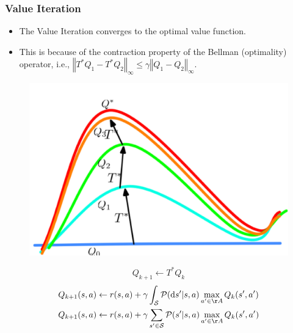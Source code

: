 \documentclass{beamer}
\newcommand{\Topt}{{T^*}}
\newcommand{\States}{\mathcal{S}}
\newcommand{\PKernel}{\mathcal{P}}
\newcommand{\ds}{\mathrm{d}s}
\newcommand{\norm}[1]{\left\Vert#1\right\Vert}
\begin{document}
\begin{frame}\frametitle{Value Iteration}\small
\begin{itemize}
	\item The Value Iteration converges to the optimal value function.
	\item This is because of the contraction property of the Bellman (optimality) operator, i.e., $\norm{\Topt Q_1 - \Topt Q_2}_\infty \leq \gamma \norm{Q_1 - Q_2}_\infty$.
\end{itemize}
	\begin{figure}
		\includegraphics[width=0.4\linewidth]{Figures/VI_Convergence} 
		\vspace{-0.2in}
	\end{figure}
\[
	Q_{k+1} \leftarrow \Topt Q_k
\]
\begin{align*}
	&
	Q_{k+1}(s,a) \leftarrow r(s,a) + \gamma \int_{\States} \PKernel(\ds' | s,a) \max_{a' \in \AA} Q_k(s',a')
	\\
	& Q_{k+1}(s,a) \leftarrow r(s,a) + \gamma \sum_{s' \in \States} \PKernel(s' | s,a) \max_{a' \in \AA} Q_k(s',a')
\end{align*}
\end{frame}
\end{document}
